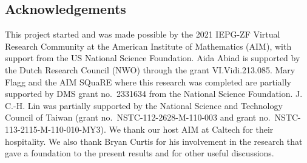 \documentclass{article}
\theoremstyle{definition}
\begin{document}
\subsection*{Acknowledgements}
This project started and was made possible by the 2021 IEPG-ZF Virtual Research Community at the American Institute of Mathematics (AIM), with support from the US National Science Foundation. 
Aida Abiad is supported by the Dutch Research Council (NWO) through the grant VI.Vidi.213.085. 
Mary Flagg and the AIM SQuaRE where this research was completed are partially supported by DMS grant no.~2331634 from the National Science Foundation. J. C.-H. Lin was partially supported by the National Science and Technology Council of Taiwan (grant no.~NSTC-112-2628-M-110-003 and grant no.~NSTC-113-2115-M-110-010-MY3). We thank our host AIM at Caltech for their hospitality.
We also thank Bryan Curtis for his involvement in the research that gave a foundation to the present results and for other useful discussions.

% 
\end{document}
